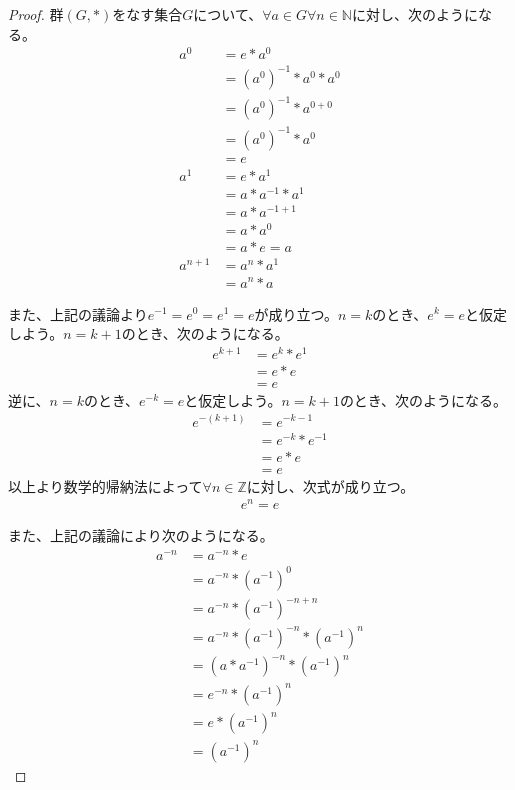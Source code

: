 \documentclass[dvipdfmx]{jsarticle}
\begin{document}
\begin{proof}
群$(G,*)$をなす集合$G$について、$\forall a \in G\forall n \in \mathbb{N}$に対し、次のようになる。
\begin{align*}
a^{0} &= e*a^{0}\\
&= \left( a^{0} \right)^{- 1}*a^{0}*a^{0}\\
&= \left( a^{0} \right)^{- 1}*a^{0 + 0}\\
&= \left( a^{0} \right)^{- 1}*a^{0}\\
&= e\\
a^{1} &= e*a^{1}\\
&= a*a^{- 1}*a^{1}\\
&= a*a^{- 1 + 1}\\
&= a*a^{0}\\
&= a*e = a\\
a^{n + 1} &= a^{n}*a^{1}\\
&= a^{n}*a
\end{align*}\par
また、上記の議論より$e^{- 1} = e^{0} = e^{1} = e$が成り立つ。$n = k$のとき、$e^{k} = e$と仮定しよう。$n = k + 1$のとき、次のようになる。
\begin{align*}
e^{k + 1} &= e^{k}*e^{1}\\
&= e*e\\
&= e
\end{align*}
逆に、$n = k$のとき、$e^{- k} = e$と仮定しよう。$n = k + 1$のとき、次のようになる。
\begin{align*}
e^{- (k + 1)} &= e^{- k - 1}\\
&= e^{- k}*e^{- 1}\\
&= e*e\\
&= e
\end{align*}
以上より数学的帰納法によって$\forall n \in \mathbb{Z}$に対し、次式が成り立つ。
\begin{align*}
e^{n} = e
\end{align*}\par
また、上記の議論により次のようになる。
\begin{align*}
a^{- n} &= a^{- n}*e\\
&= a^{- n}*\left( a^{- 1} \right)^{0}\\
&= a^{- n}*\left( a^{- 1} \right)^{- n + n}\\
&= a^{- n}*\left( a^{- 1} \right)^{- n}*\left( a^{- 1} \right)^{n}\\
&= \left( a*a^{- 1} \right)^{- n}*\left( a^{- 1} \right)^{n}\\
&= e^{- n}*\left( a^{- 1} \right)^{n}\\
&= e*\left( a^{- 1} \right)^{n}\\
&= \left( a^{- 1} \right)^{n}
\end{align*}
\end{proof}
\end{document}
